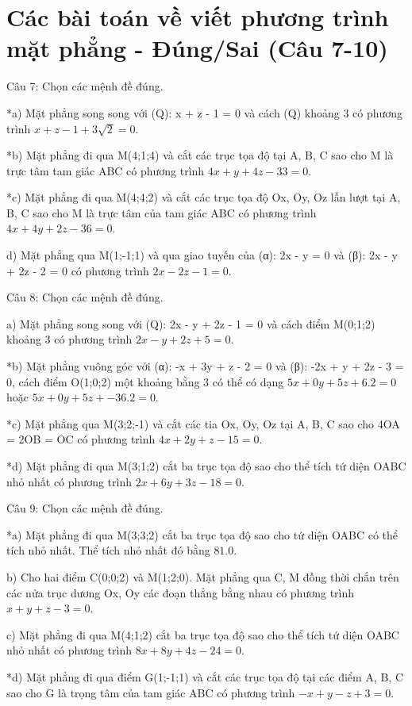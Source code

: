 \documentclass[a4paper,12pt]{article}
\begin{document}
\section*{Các bài toán về viết phương trình mặt phẳng - Đúng/Sai (Câu 7-10)}

Câu 7: Chọn các mệnh đề đúng.

*a) Mặt phẳng song song với (Q): x + z - 1 = 0 và cách (Q) khoảng 3 có phương trình \(x + z - 1 + 3\sqrt{2} = 0\).

*b) Mặt phẳng đi qua M(4;1;4) và cắt các trục tọa độ tại A, B, C sao cho M là trực tâm tam giác ABC có phương trình \(4x + y + 4z - 33 = 0\).

*c) Mặt phẳng đi qua M(4;4;2) và cắt các trục tọa độ Ox, Oy, Oz lần lượt tại A, B, C sao cho M là trực tâm của tam giác ABC có phương trình \(4x + 4y + 2z - 36 = 0\).

d) Mặt phẳng qua M(1;-1;1) và qua giao tuyến của (α): 2x - y = 0 và (β): 2x - y + 2z - 2 = 0 có phương trình \(2x - 2z - 1 = 0\).



Câu 8: Chọn các mệnh đề đúng.

a) Mặt phẳng song song với (Q): 2x - y + 2z - 1 = 0 và cách điểm M(0;1;2) khoảng 3 có phương trình \(2x - y + 2z + 5 = 0\).

*b) Mặt phẳng vuông góc với (α): -x + 3y + z - 2 = 0 và (β): -2x + y + 2z - 3 = 0, cách điểm O(1;0;2) một khoảng bằng 3 có thể có dạng \(5x + 0y + 5z + 6.2 = 0\) hoặc \(5x + 0y + 5z + -36.2 = 0\).

*c) Mặt phẳng qua M(3;2;-1) và cắt các tia Ox, Oy, Oz tại A, B, C sao cho 4OA = 2OB = OC có phương trình \(4x + 2y + z - 15 = 0\).

*d) Mặt phẳng đi qua M(3;1;2) cắt ba trục tọa độ sao cho thể tích tứ diện OABC nhỏ nhất có phương trình \(2x + 6y + 3z - 18 = 0\).



Câu 9: Chọn các mệnh đề đúng.

*a) Mặt phẳng đi qua M(3;3;2) cắt ba trục tọa độ sao cho tứ diện OABC có thể tích nhỏ nhất. Thể tích nhỏ nhất đó bằng \(81.0\).

b) Cho hai điểm C(0;0;2) và M(1;2;0). Mặt phẳng qua C, M đồng thời chắn trên các nửa trục dương Ox, Oy các đoạn thẳng bằng nhau có phương trình \(x + y + z - 3 = 0\).

c) Mặt phẳng đi qua M(4;1;2) cắt ba trục tọa độ sao cho thể tích tứ diện OABC nhỏ nhất có phương trình \(8x + 8y + 4z - 24 = 0\).

*d) Mặt phẳng đi qua điểm G(1;-1;1) và cắt các trục tọa độ tại các điểm A, B, C sao cho G là trọng tâm của tam giác ABC có phương trình \(-x + y - z + 3 = 0\).
\end{document}

